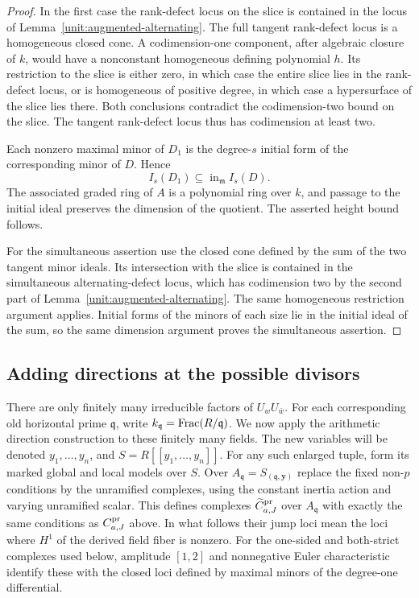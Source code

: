 \begin{proof}
In the first case the rank-defect locus on the slice is contained
in the locus of Lemma~\ref{unit:augmented-alternating}.  The full
tangent rank-defect locus is a homogeneous closed cone.  A
codimension-one component, after algebraic closure of $k$, would
have a nonconstant homogeneous defining polynomial $h$.  Its
restriction to the slice is either zero, in which case the entire
slice lies in the rank-defect locus, or is homogeneous of positive
degree, in which case a hypersurface of the slice lies there.
Both conclusions contradict the codimension-two bound on the
slice.  The tangent rank-defect locus thus has codimension at least
two.

Each nonzero maximal minor of $D_1$ is the degree-$s$ initial form
of the corresponding minor of $D$.  Hence
\[
 I_s(D_1)\subseteq\operatorname{in}_{\mathfrak m} I_s(D).
\]
The associated graded ring of $A$ is a polynomial ring over $k$,
and passage to the initial ideal preserves the dimension of the
quotient.  The asserted height bound follows.

For the simultaneous assertion use the closed cone defined by the
sum of the two tangent minor ideals.  Its intersection with the
slice is contained in the simultaneous alternating-defect locus,
which has codimension two by the second part of
Lemma~\ref{unit:augmented-alternating}.  The same homogeneous
restriction argument applies.  Initial forms of the minors of
each size lie in the initial ideal of the sum, so the same
dimension argument proves the simultaneous assertion.
\end{proof}

\subsection{Adding directions at the possible divisors}

There are only finitely many irreducible factors of $U_wU_{\bar w}$.
For each corresponding old horizontal prime $\mathfrak q$, write
$k_{\mathfrak q}=\operatorname{Frac}(R/\mathfrak q)$.  We now apply the arithmetic
direction construction to these finitely many fields.  The
new variables will be denoted $y_1,\ldots,y_n$, and
$S=R[[y_1,\ldots,y_n]]$.
For any such enlarged tuple, form its marked global and local
models over $S$.  Over
$A_{\mathfrak q}=S_{(\mathfrak q,\mathbf y)}$ replace the fixed
non-$p$ conditions by the unramified complexes, using the
constant inertia action and varying unramified scalar.  This
defines complexes $\widetilde C^{\rm pr}_{a,J}$ over
$A_{\mathfrak q}$ with exactly the same conditions as
$C^{\rm pr}_{a,J}$ above.  In what follows their jump loci mean
the loci where $H^1$ of the derived field fiber is nonzero.
For the one-sided and both-strict complexes used below, amplitude
$[1,2]$ and nonnegative Euler characteristic identify these with
the closed loci defined by maximal minors of the degree-one
differential.

